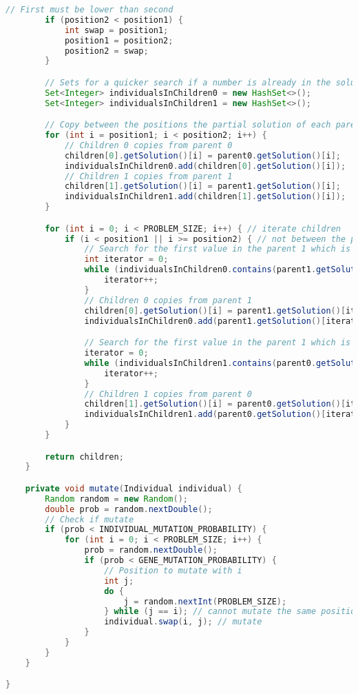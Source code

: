 \begin{lstlisting}[language=java,caption={Genetic.java},captionpos=b]
        // First must be lower than second
        if (position2 < position1) {
            int swap = position1;
            position1 = position2;
            position2 = swap;
        }

        // Sets for a quicker search if a number is already in the solution of a child
        Set<Integer> individualsInChildren0 = new HashSet<>();
        Set<Integer> individualsInChildren1 = new HashSet<>();

        // Copy between the positions the partial solution of each parent
        for (int i = position1; i < position2; i++) {
            // Children 0 copies from parent 0
            children[0].getSolution()[i] = parent0.getSolution()[i];
            individualsInChildren0.add(children[0].getSolution()[i]);
            // Children 1 copies from parent 1
            children[1].getSolution()[i] = parent1.getSolution()[i];
            individualsInChildren1.add(children[1].getSolution()[i]);
        }

        for (int i = 0; i < PROBLEM_SIZE; i++) { // iterate children
            if (i < position1 || i >= position2) { // not between the positions
                // Search for the first value in the parent 1 which is not currently in the child 0
                int iterator = 0;
                while (individualsInChildren0.contains(parent1.getSolution()[iterator])) {
                    iterator++;
                }
                // Children 0 copies from parent 1
                children[0].getSolution()[i] = parent1.getSolution()[iterator];
                individualsInChildren0.add(parent1.getSolution()[iterator]);

                // Search for the first value in the parent 1 which is not currently in the child 0
                iterator = 0;
                while (individualsInChildren1.contains(parent0.getSolution()[iterator])) {
                    iterator++;
                }
                // Children 1 copies from parent 0
                children[1].getSolution()[i] = parent0.getSolution()[iterator];
                individualsInChildren1.add(parent0.getSolution()[iterator]);
            }
        }

        return children;
    }

    private void mutate(Individual individual) {
        Random random = new Random();
        double prob = random.nextDouble();
        // Check if mutate
        if (prob < INDIVIDUAL_MUTATION_PROBABILITY) {
            for (int i = 0; i < PROBLEM_SIZE; i++) {
                prob = random.nextDouble();
                if (prob < GENE_MUTATION_PROBABILITY) {
                    // Position to mutate with i
                    int j;
                    do {
                        j = random.nextInt(PROBLEM_SIZE);
                    } while (j == i); // cannot mutate the same position
                    individual.swap(i, j); // mutate
                }
            }
        }
    }

}
\end{lstlisting}
